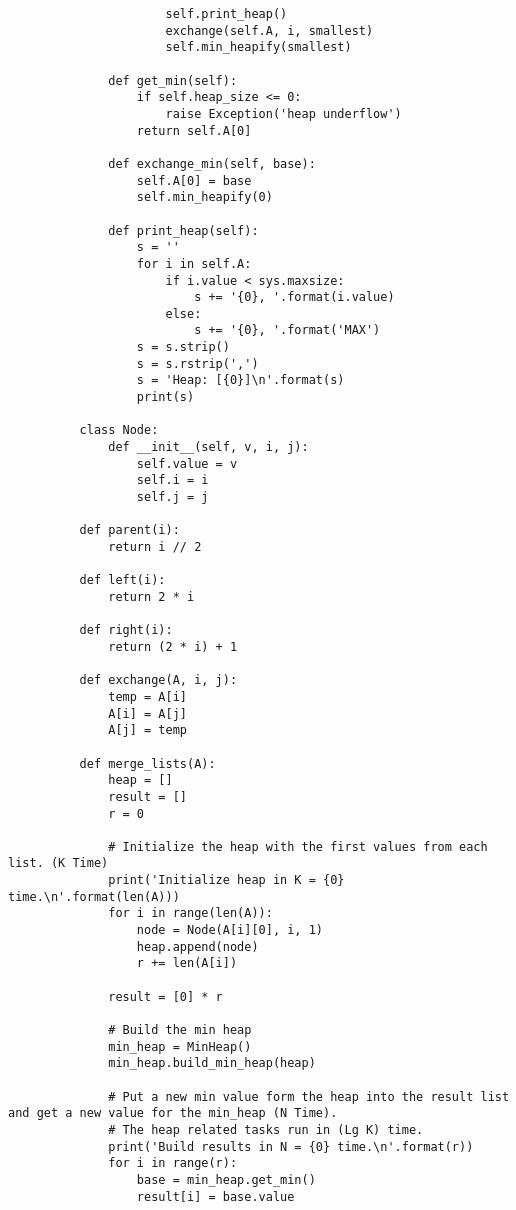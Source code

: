 \documentclass{article}
\begin{document}
\begin{enumerate}
\begin{lstlisting}
                      self.print_heap()            
                      exchange(self.A, i, smallest) 
                      self.min_heapify(smallest)
            
              def get_min(self): 
                  if self.heap_size <= 0:
                      raise Exception('heap underflow') 
                  return self.A[0] 
            
              def exchange_min(self, base):
                  self.A[0] = base 
                  self.min_heapify(0)
                  
              def print_heap(self):
                  s = ''
                  for i in self.A:
                      if i.value < sys.maxsize:
                          s += '{0}, '.format(i.value)
                      else:
                          s += '{0}, '.format('MAX')
                  s = s.strip()
                  s = s.rstrip(',')
                  s = 'Heap: [{0}]\n'.format(s)
                  print(s)
                  
          class Node:
              def __init__(self, v, i, j): 
                  self.value = v
                  self.i = i
                  self.j = j             

          def parent(i):
              return i // 2
                  
          def left(i): 
              return 2 * i 
            
          def right(i): 
              return (2 * i) + 1
            
          def exchange(A, i, j): 
              temp = A[i] 
              A[i] = A[j] 
              A[j] = temp
              
          def merge_lists(A):
              heap = [] 
              result = []
              r = 0
              
              # Initialize the heap with the first values from each list. (K Time)
              print('Initialize heap in K = {0} time.\n'.format(len(A)))
              for i in range(len(A)): 
                  node = Node(A[i][0], i, 1) 
                  heap.append(node) 
                  r += len(A[i]) 
              
              result = [0] * r
              
              # Build the min heap
              min_heap = MinHeap()    
              min_heap.build_min_heap(heap)
              
              # Put a new min value form the heap into the result list and get a new value for the min_heap (N Time).
              # The heap related tasks run in (Lg K) time.
              print('Build results in N = {0} time.\n'.format(r))
              for i in range(r): 
                  base = min_heap.get_min() 
                  result[i] = base.value 
                  

\end{lstlisting}
\end{enumerate}
\end{document}
